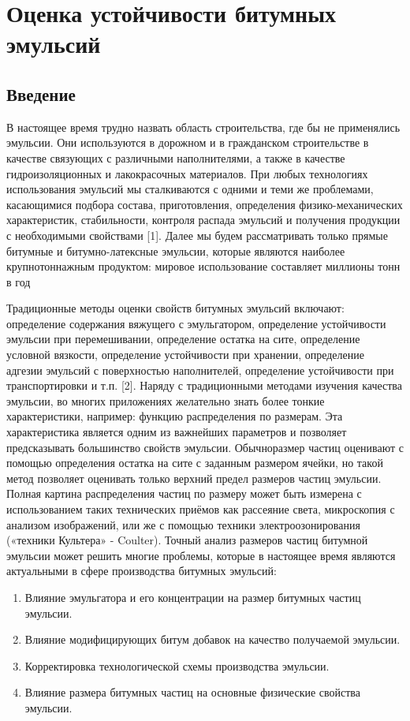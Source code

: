 \section{Оценка устойчивости битумных эмульсий}
\subsection{Введение}
В настоящее время трудно назвать область строительства, где бы не применялись эмульсии. Они используются в дорожном и в гражданском строительстве в качестве связующих с различными наполнителями, а также в качестве гидроизоляционных и лакокрасочных материалов. При любых технологиях использования эмульсий мы сталкиваются с одними и теми же проблемами, касающимися подбора состава, приготовления, определения физико-механических характеристик, стабильности, контроля распада эмульсий и получения продукции с необходимыми свойствами [1]. Далее мы будем рассматривать только прямые битумные и битумно-латексные эмульсии, которые являются наиболее крупнотоннажным продуктом: мировое использование составляет миллионы тонн в год

Традиционные методы оценки свойств битумных эмульсий включают: определение содержания вяжущего с эмульгатором, определение устойчивости эмульсии при перемешивании, определение остатка на сите, определение условной вязкости, определение устойчивости при хранении, определение адгезии эмульсий с поверхностью наполнителей, определение устойчивости при транспортировки и т.п. [2].  Наряду с традиционными методами изучения  качества эмульсии, во многих приложениях желательно знать более тонкие характеристики, например: функцию распределения по размерам. Эта характеристика является одним из важнейших параметров и позволяет предсказывать большинство свойств эмульсии. Обычноразмер частиц оценивают с помощью определения остатка на сите с заданным размером ячейки, но такой метод позволяет оценивать только верхний предел размеров частиц эмульсии. Полная картина распределения частиц по размеру может быть измерена с использованием таких технических приёмов как рассеяние света, микроскопия с анализом изображений, или же с помощью техники электроозонирования («техники Культера» - Coulter). Точный анализ размеров частиц битумной эмульсии может решить многие проблемы, которые в настоящее время являются актуальными в сфере производства битумных эмульсий:
\begin{enumerate}
\item Влияние эмульгатора и его концентрации на размер битумных частиц эмульсии.
\item Влияние модифицирующих битум добавок на качество получаемой эмульсии.
\item Корректировка технологической схемы производства эмульсии.
\item Влияние размера битумных частиц на основные физические свойства эмульсии.
\end{enumerate}

